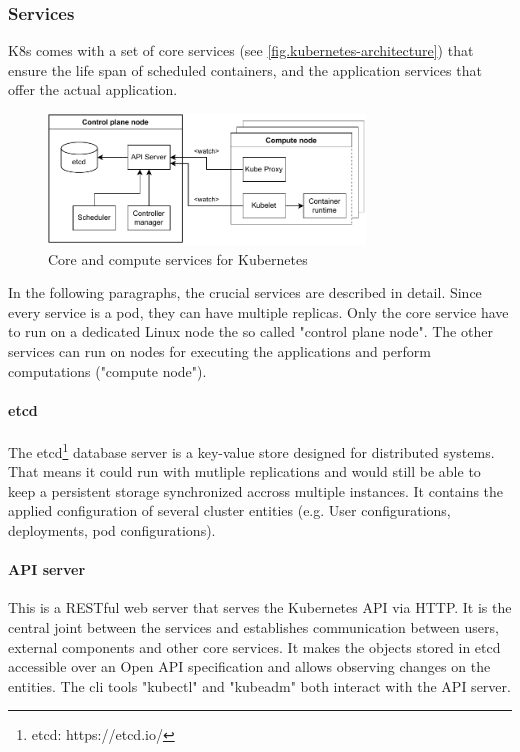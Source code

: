 \subsubsection{Services}
\ac{K8s} comes with a set of core services (see \autoref{fig.kubernetes-architecture}) that ensure the life span of scheduled containers, and the application services that offer the actual application.
\begin{figure}[h]
	\centering
	\includegraphics[width=0.75\textwidth]{Figures/kubernetes-architecture.pdf}
	\caption{Core and compute services for Kubernetes}
	\label{fig.kubernetes-architecture}
\end{figure}

In the following paragraphs, the crucial services are described in detail. Since every service is a pod, they can have multiple replicas. Only the core service have to run on a dedicated Linux node the so called "control plane node". The other services can run on nodes for executing the applications and perform computations ("compute node").

\paragraph{etcd}
The etcd\footnote{etcd: https://etcd.io/} database server is a key-value store designed for distributed systems\cite{Luksa.2018}. That means it could run with mutliple replications and would still be able to keep a persistent storage synchronized accross multiple instances. It contains the applied configuration of several cluster entities (e.g. User configurations, deployments, pod configurations).

\paragraph{API server}
This is a RESTful web server that serves the Kubernetes API via HTTP\cite{Kubernetes.20221024}. It is the central joint between the services and establishes communication between users, external components and other core services. It makes the objects stored in etcd accessible over an Open API specification\cite{Luksa.2018,OpenAPIInitiative.20230210} and allows observing changes on the entities. The \ac{cli} tools "kubectl" and "kubeadm" both interact with the API server.

